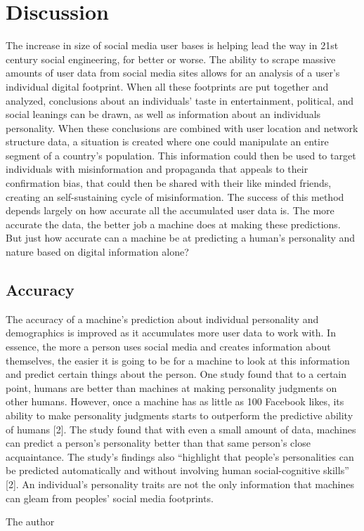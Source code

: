 \documentclass[sigconf]{acmart}
\begin{document}
\section{Discussion}

The increase in size of social media user bases is helping lead the way in 21st century social engineering, for better or worse. The ability to scrape massive amounts of user data from social media sites allows for an analysis of a user's individual digital footprint. When all these footprints are put together and analyzed, conclusions about an individuals' taste in entertainment, political, and social leanings can be drawn, as well as information about an individuals personality. When these conclusions are combined with user location and network structure data, a situation is created where one could manipulate an entire segment of a country's population. This information could then be used to target individuals with misinformation and propaganda that appeals to their confirmation bias, that could then be shared with their like minded friends, creating an self-sustaining cycle of misinformation. The success of this method depends largely on how accurate all the accumulated user data is. The more accurate the data, the better job a machine does at making these predictions. But just how accurate can a machine be at predicting a human's personality and nature based on digital information alone?


\subsection{Accuracy}

The accuracy of a machine's prediction about individual personality and demographics is improved as it accumulates more user data to work with. In essence, the more a person uses social media and creates information about themselves, the easier it is going to be for a machine to look at this information and predict certain things about the person. One study found that to a certain point, humans are better than machines at making personality judgments on other humans. However, once a machine has as little as 100 Facebook likes, its ability to make personality judgments starts to outperform the predictive ability of humans [2]. The study found that with even a small amount of data, machines can predict a person's personality better than that same person's close acquaintance. The study's findings also ``highlight that people's personalities can be predicted automatically and without involving human social-cognitive skills'' [2].
An individual's personality traits are not the only information that machines can gleam from peoples' social media footprints. 

\begin{acks}

  The author

\end{acks}


 \cite{abril07}
\end{document}
